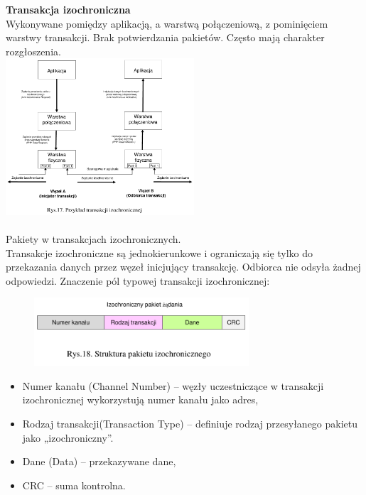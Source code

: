 	\textbf{Transakcja izochroniczna}\\
	Wykonywane pomiędzy aplikacją, a warstwą połączeniową, z pominięciem warstwy transakcji. Brak potwierdzania pakietów. Często mają charakter rozgłoszenia.\\
	\includegraphics[width=7cm]{./wyklady/FIREWIRE_19_1.pdf}\\\\
	Pakiety w transakcjach izochronicznych.\\
	Transakcje izochroniczne są jednokierunkowe i ograniczają się tylko do przekazania danych przez węzeł inicjujący transakcję. Odbiorca nie odsyła żadnej odpowiedzi. Znaczenie pól typowej transakcji izochronicznej:
	\begin{figure}
		\includegraphics[width=8cm]{./wyklady/FIREWIRE_20_1.pdf}
	\end{figure}
	\begin{itemize}
		\item Numer kanału (Channel Number) – węzły uczestniczące w transakcji izochronicznej wykorzystują numer kanału jako adres,
		\item Rodzaj transakcji(Transaction Type) – definiuje rodzaj przesyłanego pakietu jako „izochroniczny”.
		\item Dane (Data) – przekazywane dane,
		\item CRC – suma kontrolna.
	\end{itemize}
	\clearpage
	
	
